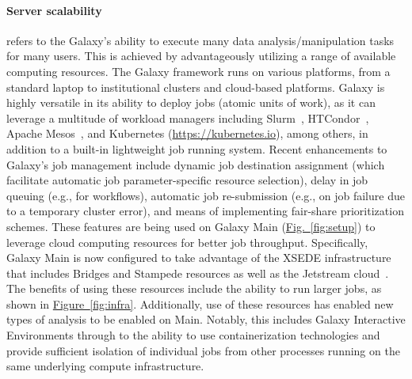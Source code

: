 \paragraph*{Server scalability} refers to the Galaxy’s ability to execute many data analysis/manipulation tasks for many users. This is achieved by advantageously utilizing a range of available computing resources. The Galaxy framework runs on various platforms, from a standard laptop to institutional clusters and cloud-based platforms. Galaxy is highly versatile in its ability to deploy jobs (atomic units of work), as it can leverage a multitude of workload managers including Slurm~\cite{yoo2003slurm}, HTCondor~\cite{thain2005distributed}, Apache Mesos~\cite{hindman2011mesos}, and Kubernetes (\url{https://kubernetes.io}), among others, in addition to a built-in lightweight job running system. Recent enhancements to Galaxy’s job management include dynamic job destination assignment (which facilitate automatic job parameter-specific resource selection), delay in job queuing (e.g., for workflows), automatic job re-submission (e.g., on job failure due to a temporary cluster error), and means of implementing fair-share prioritization schemes. These features are being used on Galaxy Main (\hyperref[fig:setup]{Fig.~\ref{fig:setup}}) to leverage cloud computing resources for better job throughput. Specifically, Galaxy Main is now configured to take advantage of the XSEDE infrastructure~\cite{towns2014xsede} that includes Bridges and Stampede resources as well as the Jetstream cloud~\cite{stewart2015jetstream}. The benefits of using these resources include the ability to run larger jobs, as shown in \hyperref[fig:infra]{Figure~\ref{fig:infra}}. Additionally, use of these resources has enabled new types of analysis to be enabled on Main. Notably, this includes Galaxy Interactive Environments through to the ability to use containerization technologies and provide sufficient isolation of individual jobs from other processes running on the same underlying compute infrastructure.

